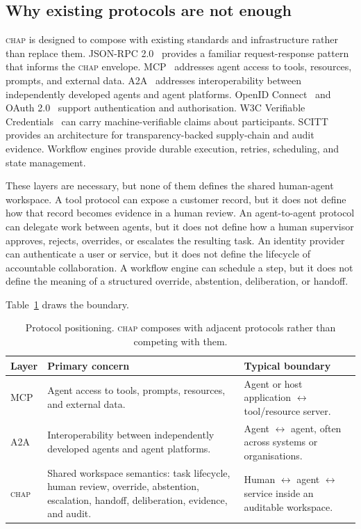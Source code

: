 \documentclass[11pt]{article}
\newcommand{\chap}{\textsc{chap}}
\begin{document}
\subsection{Why existing protocols are not enough}

\chap{} is designed to compose with existing standards and infrastructure rather than replace them. JSON-RPC 2.0~\cite{jsonrpc} provides a familiar request-response pattern that informs the \chap{} envelope. MCP~\cite{mcp} addresses agent access to tools, resources, prompts, and external data. A2A~\cite{a2a} addresses interoperability between independently developed agents and agent platforms. OpenID Connect~\cite{oidc} and OAuth 2.0~\cite{oauth} support authentication and authorisation. W3C Verifiable Credentials~\cite{vc20} can carry machine-verifiable claims about participants. SCITT~\cite{scitt} provides an architecture for transparency-backed supply-chain and audit evidence. Workflow engines provide durable execution, retries, scheduling, and state management.

These layers are necessary, but none of them defines the shared human-agent workspace. A tool protocol can expose a customer record, but it does not define how that record becomes evidence in a human review. An agent-to-agent protocol can delegate work between agents, but it does not define how a human supervisor approves, rejects, overrides, or escalates the resulting task. An identity provider can authenticate a user or service, but it does not define the lifecycle of accountable collaboration. A workflow engine can schedule a step, but it does not define the meaning of a structured override, abstention, deliberation, or handoff.

Table~\ref{tab:protocol-positioning} draws the boundary.

\begin{table}[h]
\centering
\caption{Protocol positioning. \chap{} composes with adjacent protocols rather than competing with them.}
\label{tab:protocol-positioning}
\begin{tabularx}{\textwidth}{@{}p{2.6cm}X X@{}}
\toprule
\textbf{Layer} & \textbf{Primary concern} & \textbf{Typical boundary} \\
\midrule
MCP & Agent access to tools, prompts, resources, and external data. & Agent or host application $\leftrightarrow$ tool/resource server. \\
A2A & Interoperability between independently developed agents and agent platforms. & Agent $\leftrightarrow$ agent, often across systems or organisations. \\
\chap{} & Shared workspace semantics: task lifecycle, human review, override, abstention, escalation, handoff, deliberation, evidence, and audit. & Human $\leftrightarrow$ agent $\leftrightarrow$ service inside an auditable workspace. \\
\bottomrule
\end{tabularx}
\end{table}
\end{document}
